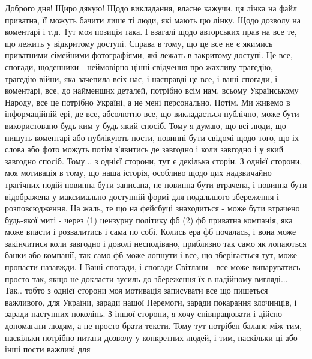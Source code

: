  
 
 
 
 

Доброго дня! Щиро дякую! Щодо викладання, власне кажучи, ця лінка на файл
приватна, її можуть бачити лише ті люди, які мають цю лінку. Щодо дозволу на
коментарі і т.д. Тут моя позиція така.  І взагалі щодо авторських прав на все
те, що лежить у відкритому доступі.  Справа в тому, що це все не є якимись
приватними сімейними фотографіями, які лежать в закритому доступі. Це все,
спогади, щоденники - неймовірно цінні свідчення про жахливу трагедію, трагедію
війни, яка зачепила всіх нас, і насправді це все, і ваші спогади, і коментарі,
все, до найменших деталей, потрібно всім нам, всьому Українському Народу, все
це потрібно Україні, а не мені персонально. Потім. Ми живемо в інформаційній
ері, де все, абсолютно все, що викладається публічно, може бути використовано
будь-ким у будь-який спосіб. Тому я думаю, що всі люди, що пишуть коментарі або
публікують пости, повинні бути свідомі щодо того, що іх слова або фото можуть
потім з'явитись де завгодно і коли завгодно і у який завгодно спосіб. Тому... з
однієї сторони, тут є декілька сторін. З однієї сторони, моя мотивація в тому,
що наша історія, особливо щодо цих надзвичайно трагічних подій повинна бути
записана, не повинна бути втрачена, і повинна бути відображена у максимально
доступній формі для подальшого збереження і розповсюдження. На жаль, те що на
фейсбуці знаходиться - може бути втрачено будь-якої миті - через (1) цензурну
політику фб (2) фб приватна компанія, яка може впасти і розвалитись і сама по
собі. Колись ера фб почалась, і вона може закінчитися коли завгодно і доволі
несподівано, приблизно так само як лопаються банки або компанії, так само фб
може лопнути і все, що зберігається тут, може пропасти назавжди. І Ваші
спогади, і спогади Світлани - все може випаруватись просто так, якщо не
докласти зусиль до збереження їх в надійному вигляді...  Так.. тобто з однієї
сторони моя мотивація записувати все що пишеться важливого, для України, заради
нашої Перемоги, заради покарання злочинців, і заради наступних поколінь.  З
іншої сторони, я хочу співпрацювати і дійсно допомагати людям, а не просто
брати тексти. Тому тут потрібен баланс між тим, наскільки потрібно питати
дозволу у конкретних людей, і тим, наскільки ці або інші пости важливі для
